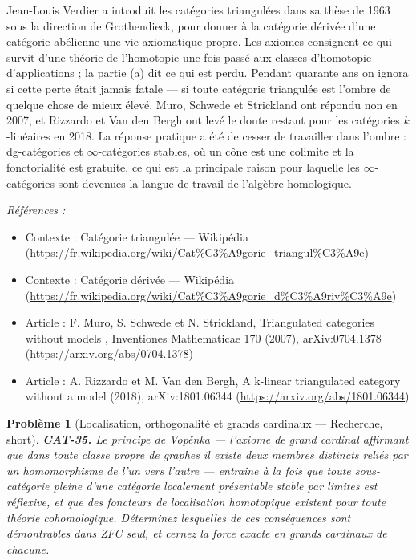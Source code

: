 \documentclass[11pt]{article}
\newtheorem{problem}{Problème}
\newenvironment{refs}{\par\small\noindent\emph{Références :}\begin{itemize}\setlength\itemsep{0pt}}{\end{itemize}\normalsize}
\begin{document}
\noindent Jean-Louis Verdier a introduit les catégories triangulées dans sa thèse de 1963
sous la direction de Grothendieck, pour donner à la catégorie dérivée d'une catégorie abélienne une
vie axiomatique propre. Les axiomes consignent ce qui survit d'une théorie de l'homotopie une fois
passé aux classes d'homotopie d'applications ; la partie (a) dit ce qui est perdu. Pendant quarante
ans on ignora si cette perte était jamais fatale --- si toute catégorie triangulée est l'ombre de
quelque chose de mieux élevé. Muro, Schwede et Strickland ont répondu non en 2007, et Rizzardo et
Van den Bergh ont levé le doute restant pour les catégories $ k $-linéaires en 2018. La réponse
pratique a été de cesser de travailler dans l'ombre : dg-catégories et $\infty$-catégories stables, où un
cône est une colimite et la fonctorialité est gratuite, ce qui est la principale raison pour
laquelle les $\infty$-catégories sont devenues la langue de travail de l'algèbre homologique.

\begin{refs}
\item Contexte : Catégorie triangulée --- Wikipédia (\url{https://fr.wikipedia.org/wiki/Cat%C3%A9gorie_triangul%C3%A9e})
\item Contexte : Catégorie dérivée --- Wikipédia (\url{https://fr.wikipedia.org/wiki/Cat%C3%A9gorie_d%C3%A9riv%C3%A9e})
\item Article : F. Muro, S. Schwede et N. Strickland, \og{} Triangulated categories without models \fg{}, Inventiones Mathematicae 170 (2007), arXiv:0704.1378 (\url{https://arxiv.org/abs/0704.1378})
\item Article : A. Rizzardo et M. Van den Bergh, \og{} A k-linear triangulated category without a model \fg{} (2018), arXiv:1801.06344 (\url{https://arxiv.org/abs/1801.06344})
\end{refs}

\bigskip

\begin{problem}[{Localisation, orthogonalité et grands cardinaux --- Recherche, short}]
\textbf{CAT-35.} Le principe de Vop\v{e}nka --- l'axiome de grand cardinal
affirmant que dans toute classe propre de graphes il existe deux membres distincts reliés par un
homomorphisme de l'un vers l'autre --- entraîne à la fois que toute sous-catégorie pleine d'une
catégorie localement présentable stable par limites est réflexive, et que des foncteurs de
localisation homotopique existent pour toute théorie cohomologique. Déterminez lesquelles de ces
conséquences sont démontrables dans ZFC seul, et cernez la force exacte en grands cardinaux de
chacune.
\end{problem}
\end{document}
